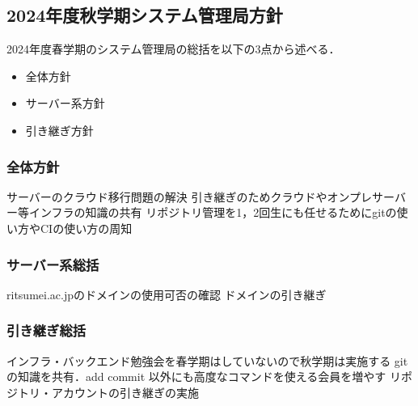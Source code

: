 \subsection*{2024年度秋学期システム管理局方針}


2024年度春学期のシステム管理局の総括を以下の3点から述べる．
\begin{itemize}
    \item 全体方針
    \item サーバー系方針
    \item 引き継ぎ方針
\end{itemize}

\subsubsection*{全体方針}
サーバーのクラウド移行問題の解決
引き継ぎのためクラウドやオンプレサーバー等インフラの知識の共有
リポジトリ管理を1，2回生にも任せるためにgitの使い方やCIの使い方の周知

\subsubsection*{サーバー系総括}
ritsumei.ac.jpのドメインの使用可否の確認
ドメインの引き継ぎ

\subsubsection*{引き継ぎ総括}
インフラ・バックエンド勉強会を春学期はしていないので秋学期は実施する
gitの知識を共有．add commit 以外にも高度なコマンドを使える会員を増やす
リポジトリ・アカウントの引き継ぎの実施
